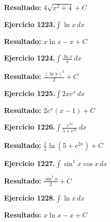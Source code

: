 \documentclass[10pt,a4paper]{article}
\begin{document}
\begin{solbox}
\textbf{Resultado:} \(\displaystyle 4\sqrt{x^2+4} + C\)
\end{solbox}

\begin{ejbox}
\textbf{Ejercicio 1223.}\quad $\int \ln x\,dx$
\end{ejbox}

\begin{solbox}
\textbf{Resultado:} \(\displaystyle x\ln x - x + C\)
\end{solbox}

\begin{ejbox}
\textbf{Ejercicio 1224.}\quad $\int \frac{\ln x}{x}\,dx$
\end{ejbox}

\begin{solbox}
\textbf{Resultado:} \(\displaystyle \frac{(\ln x)^2}{2} + C\)
\end{solbox}

\newpage
\begin{ejbox}
\textbf{Ejercicio 1225.}\quad $\int 2x e^{x}\,dx$
\end{ejbox}

\begin{solbox}
\textbf{Resultado:} \(\displaystyle 2e^x(x-1) + C\)
\end{solbox}

\begin{ejbox}
\textbf{Ejercicio 1226.}\quad $\int \frac{e^{2x}}{5+e^{2x}}\,dx$
\end{ejbox}

\begin{solbox}
\textbf{Resultado:} \(\displaystyle \frac{1}{2}\ln(5+e^{2x}) + C\)
\end{solbox}

\begin{ejbox}
\textbf{Ejercicio 1227.}\quad $\int \sin^{1}x \cos x\,dx$
\end{ejbox}

\begin{solbox}
\textbf{Resultado:} \(\displaystyle \frac{\sin^{2}x}{2} + C\)
\end{solbox}

\newpage
\begin{ejbox}
\textbf{Ejercicio 1228.}\quad $\int \ln x\,dx$
\end{ejbox}

\begin{solbox}
\textbf{Resultado:} \(\displaystyle x\ln x - x + C\)
\end{solbox}
\end{document}
